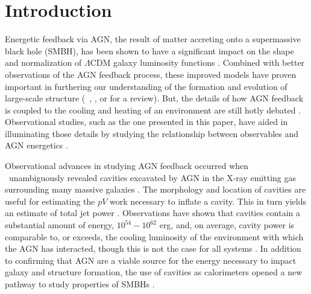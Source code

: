 \documentclass{emulateapj}
\begin{document}


\section{Introduction}
\label{sec:intro}

Energetic feedback via AGN, the result of matter accreting onto a
supermassive black hole (SMBH), has been shown to have a significant
impact on the shape and normalization of $\Lambda$CDM galaxy
luminosity functions \citep{croton06, bower06, saro06,
  sijacki07}. Combined with better observations of the AGN feedback
process, these improved models have proven important in furthering our
understanding of the formation and evolution of large-scale structure
(\eg\ \citealt{2008MNRAS.386.1309M}, \citealt{minggroups}, or
\citealt{2009arXiv0906.4370B} for a review). But, the details of how
AGN feedback is coupled to the cooling and heating of an environment
are still hotly debated \citep{2008ASPC..386..343D}. Observational
studies, such as the one presented in this paper, have aided in
illuminating those details by studying the relationship between
observables and AGN energetics \citep{birzan04, 2005MNRAS.364.1343D,
  rafferty06, dunn08, haradent, birzan08}.

Observational advances in studying AGN feedback occurred when
\chandra\ unambiguously revealed cavities excavated by AGN in the
X-ray emitting gas surrounding many massive galaxies
\citep[\eg][]{2000ApJ...534L.135M, perseus1, schindler01}. The
morphology and location of cavities are useful for estimating the $pV$
work necessary to inflate a cavity. This in turn yields an estimate of
total jet power \citep[see][for a review]{mcnamrev}. Observations have
shown that cavities contain a substantial amount of energy,
$10^{54}-10^{62}$ erg, and, on average, cavity power is comparable to,
or exceeds, the cooling luminosity of the environment with which the
AGN has interacted, though this is not the case for all systems
\citep{birzan04, rafferty06, dunn08}. In addition to confirming that
AGN are a viable source for the energy necessary to impact galaxy and
structure formation, the use of cavities as calorimeters opened a new
pathway to study properties of SMBHs \citep{2009ApJ...698..594M}.
\end{document}
